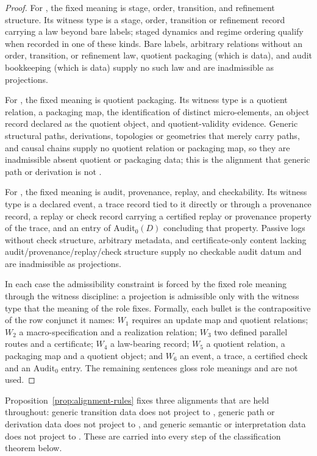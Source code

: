 \begin{proof}
For \Pfour{}, the fixed meaning is stage, order, transition, and
refinement structure. Its witness type is a stage, order, transition or
refinement record carrying a law beyond bare labels; staged dynamics and
regime ordering qualify when recorded in one of these kinds. Bare labels, arbitrary relations without an order,
transition, or refinement law, quotient packaging (which is \Pfive{}
data), and audit bookkeeping (which is \Psix{} data) supply no such law
and are inadmissible as \Pfour{} projections.

For \Pfive{}, the fixed meaning is quotient packaging. Its witness type
is a quotient relation, a packaging map, the identification of distinct
micro-elements, an object record declared as the quotient object, and
quotient-validity evidence. Generic structural paths, derivations,
topologies or geometries that merely carry paths, and causal chains
supply no quotient relation or packaging map, so they are inadmissible
absent quotient or packaging data; this is the alignment that
generic path or derivation is not \Pfive{}.

For \Psix{}, the fixed meaning is audit, provenance, replay, and
checkability. Its witness type is a declared event, a trace record tied to it directly or through a provenance record, a replay or check record carrying a certified replay or provenance property of the trace, and an entry of \(\mathrm{Audit}_0(D)\) concluding that property. Passive logs without check
structure, arbitrary metadata, and certificate-only content lacking
audit/provenance/replay/check structure supply no checkable audit datum
and are inadmissible as \Psix{} projections.

In each case the admissibility constraint is forced by the fixed role
meaning through the witness discipline: a projection is admissible only
with the witness type that the meaning of the role fixes. Formally, each
bullet is the contrapositive of the row conjunct it names: \(W_1\) requires an
update map and quotient relations; \(W_2\) a macro-specification and a
realization relation; \(W_3\) two defined parallel routes and a certificate;
\(W_4\) a law-bearing record; \(W_5\) a quotient relation, a packaging map and a
quotient object; and \(W_6\) an event, a trace, a certified check and an
\(\mathrm{Audit}_0\) entry. The remaining sentences gloss role meanings and are
not used.
\end{proof}

\begin{remark}\label{rem:three-repaired-alignments}
Proposition~\ref{prop:alignment-rules} fixes three alignments that
are held throughout: generic transition data does not project to
\Pthree{}, generic path or derivation data does not project to
\Pfive{}, and generic semantic or interpretation data does not project
to \Pone{}. These are carried into every step of the classification
theorem below.
\end{remark}

